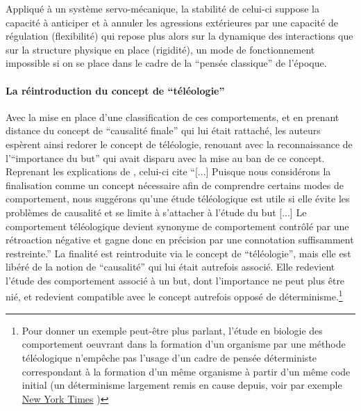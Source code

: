 Appliqué à un système servo-mécanique, la stabilité de celui-ci suppose la capacité à anticiper et à annuler les agressions extérieures par une capacité de régulation (flexibilité) qui repose plus alors sur la dynamique des interactions que sur la structure physique en place (rigidité), un mode de fonctionnement impossible si on se place dans le cadre de la \enquote{pensée classique} de l'époque. 


\paragraph{La réintroduction du concept de \enquote{téléologie}}

Avec la mise en place d'une classification de ces comportements, et en prenant distance du concept de \enquote{causalité finale} qui lui était rattaché, les auteurs espèrent ainsi redorer le concept de téléologie, renouant avec la reconnaissance de l'\enquote{importance du but} qui avait disparu avec la mise au ban de ce concept. Reprenant les explications de \autocite[776]{Pouvreau2013}, celui-ci cite \autocite[23-24]{Rosenblueth1943} \enquote{[...] Puisque nous considérons la finalisation comme un concept nécessaire afin de comprendre certains modes de comportement, nous suggérons qu'une étude téléologique est utile si elle évite les problèmes de causalité et se limite à s'attacher à l'étude du but [...] Le comportement téléologique devient synonyme de comportement contrôlé par une rétroaction négative et gagne donc en précision par une connotation suffisamment restreinte.} La finalité est reintroduite via le concept de \enquote{téléologie}, mais elle est libéré de la notion de \enquote{causalité} qui lui était autrefois associé. Elle redevient l'étude des comportement associé à un but, dont l'importance ne peut plus être nié, et redevient compatible avec le concept autrefois opposé de déterminisme.\footnote{Pour donner un exemple peut-être plus parlant, l'étude en biologie des comportement oeuvrant dans la formation d'un organisme par une méthode téléologique n'empêche pas l'usage d'un cadre de pensée déterministe  correspondant à la formation d'un même organisme à partir d'un même code initial (un déterminisme largement remis en cause depuis, voir par exemple \href{http://www.nytimes.com/2014/01/21/science/seeing-x-chromosomes-in-a-new-light.html?ref=science&_r=0}{New York Times} )}

